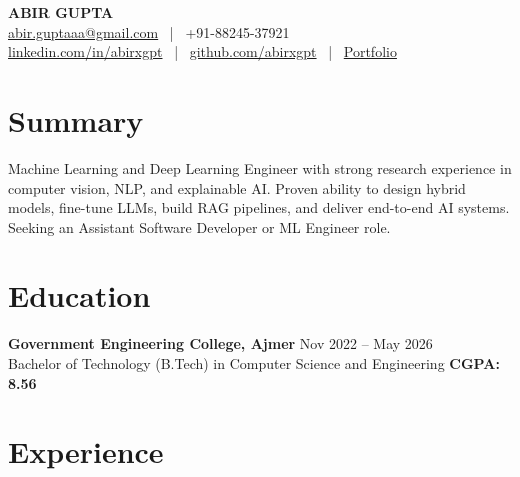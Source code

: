\documentclass[a4paper,10pt]{article}
\begin{document}
\begin{center}
    {\Huge \textbf{ABIR GUPTA}} \\ \vspace{4pt}
    \href{mailto:abir.guptaaa@gmail.com}{abir.guptaaa@gmail.com} \ | \ +91-88245-37921 \\
    \href{https://linkedin.com/in/abirxgpt}{linkedin.com/in/abirxgpt} \ | \
    \href{https://github.com/abirxgpt}{github.com/abirxgpt} \ | \
    \href{https://portfolio-abir-liard.vercel.app/}{Portfolio} 
\end{center}

\section{Summary}
Machine Learning and Deep Learning Engineer with strong research experience in computer vision, NLP, and explainable AI. Proven ability to design hybrid models, fine-tune LLMs, build RAG pipelines, and deliver end-to-end AI systems. Seeking an Assistant Software Developer or ML Engineer role.

\section{Education}
\textbf{Government Engineering College, Ajmer} \hfill Nov 2022 -- May 2026 \\
Bachelor of Technology (B.Tech) in Computer Science and Engineering \hfill \textbf{CGPA: 8.56}

\section{Experience}
\end{document}
